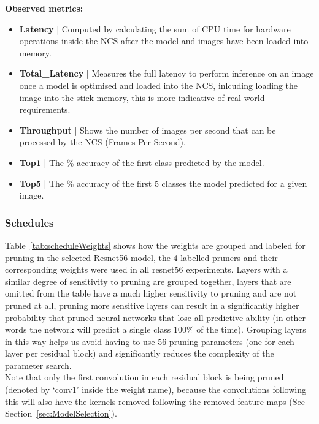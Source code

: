 \documentclass[../Dissertation.tex]{subfiles}
\begin{document}
\singlespacing
\noindent\textbf{Observed metrics:}
\begin{itemize}
    \item \textbf{Latency} | Computed by calculating the sum of CPU time for hardware operations inside the NCS after the model and images have been loaded into memory.
    \item \textbf{Total\_Latency} | Measures the full latency to perform inference on an image once a model is optimised and loaded into the NCS, inlcuding loading the image into the stick memory, this is more indicative of real world requirements.
    \item \textbf{Throughput} | Shows the number of images per second that can be processed by the NCS (Frames Per Second).
    \item \textbf{Top1} | The \% accuracy of the first class predicted by the model.
    \item \textbf{Top5} | The \% accuracy of the first 5 classes the model predicted for a given image.
\end{itemize}
\doublespacing

\newpage
\subsubsection{Schedules}
Table~\ref{tab:scheduleWeights} shows how the weights are grouped and labeled for pruning in the selected Resnet56 model, the 4 labelled pruners and their corresponding weights were used in all resnet56 experiments.
Layers with a similar degree of sensitivity to pruning are grouped together, layers that are omitted from the table have a much higher sensitivity to pruning and are not pruned at all, pruning more sensitive layers can result in a significantly higher probability that pruned neural networks that lose all predictive ability (in other words the network will predict a single class 100\% of the time).
Grouping layers in this way helps us avoid having to use 56 pruning parameters (one for each layer per residual block) and significantly reduces the complexity of the parameter search.\\

Note that only the first convolution in each residual block is being pruned (denoted by `conv1' inside the weight name), because the convolutions following this will also have the kernels removed following the removed feature maps (See Section~\ref{sec:ModelSelection}).
\end{document}

